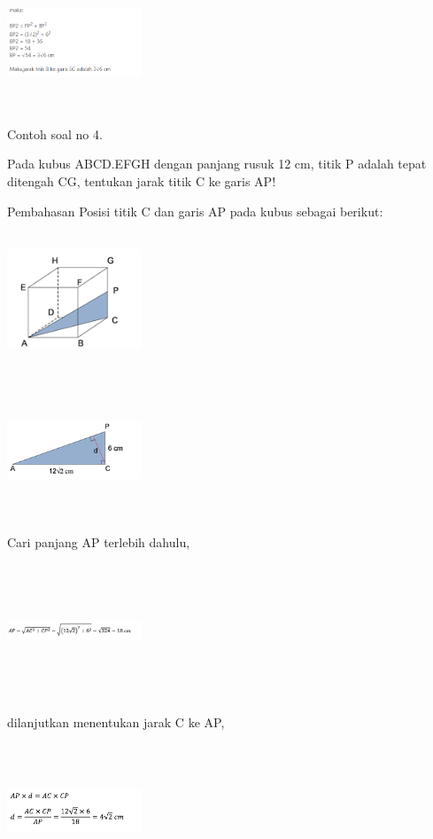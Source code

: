 \documentclass[11pt,fleqn]{book} %
\begin{document}
\includegraphics[width = 4cm, height= 4cm]{Pictures/20.png}

Contoh soal no 4.

Pada kubus ABCD.EFGH dengan panjang rusuk 12 cm, titik P adalah tepat ditengah CG, tentukan jarak titik C ke garis AP!

Pembahasan
Posisi titik C dan garis AP pada kubus sebagai berikut: 

\includegraphics[width = 4cm, height= 4cm]{Pictures/gi21.png}

\includegraphics[width = 4cm, height= 4cm]{Pictures/gi22.png}

Cari panjang AP terlebih dahulu, 

\includegraphics[width = 4cm, height= 4cm]{Pictures/gi23.png}

dilanjutkan menentukan jarak C ke AP,

\includegraphics[width = 4cm, height= 4cm]{Pictures/gi24.png}
\end{document}
